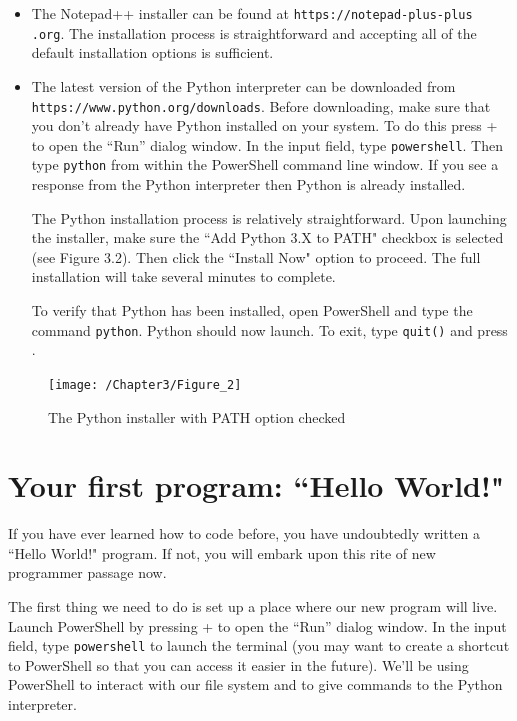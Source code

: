 \documentclass{book}
\begin{document}
\begin{itemize}
	\item The Notepad++ installer can be found at \texttt{https://notepad-plus-plus
		.org}. The installation process is straightforward and accepting all of the default installation options is sufficient.
	\item The latest version of the Python interpreter can be downloaded from 
	\texttt{https://www.python.org/downloads}. Before downloading, make sure that you don't already have Python installed on your system. To do this press  +  to open the ``Run'' dialog window. In the input field, type \texttt{powershell}. Then type \texttt{python} from within the PowerShell command line window. If you see a response from the Python interpreter then Python is already installed.
	
	The Python installation process is relatively straightforward. Upon launching the installer, make sure the ``Add Python 3.X to PATH" checkbox is selected (see Figure 3.2). Then click the ``Install Now" option to proceed. The full installation will take several minutes to complete.
	
	To verify that Python has been installed, open PowerShell and type the command \texttt{python}. Python should now launch. To exit, type \texttt{quit()} and press .
\end{itemize}

\begin{figure}[h]
	\caption{The Python installer with PATH option checked}
	\centering\texttt{[image: /Chapter3/Figure\_2]}
\end{figure}

\section{Your first program: ``Hello World!"}
If you have ever learned how to code before, you have undoubtedly written a ``Hello World!" program. If not, you will embark upon this rite of new programmer passage now.

The first thing we need to do is set up a place where our new program will live. Launch PowerShell by pressing  +  to open the ``Run'' dialog window. In the input field, type \texttt{powershell} to launch the terminal (you may want to create a shortcut to PowerShell so that you can access it easier in the future). We'll be using PowerShell to interact with our file system and to give commands to the Python interpreter. 
\end{document}
